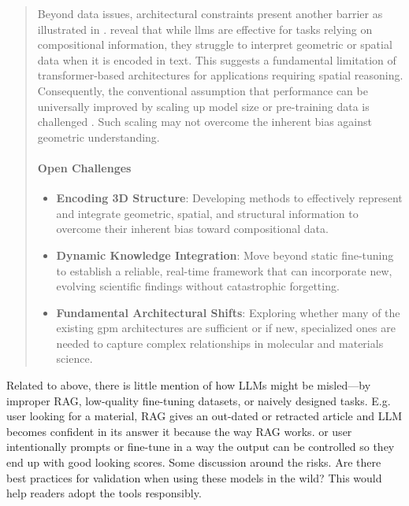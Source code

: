 \begin{reply}
\begin{quote}
Beyond data issues, architectural constraints present another barrier as illustrated in . \textcite{alampara2024mattext} reveal that while \glspl{llm} are effective for tasks relying on compositional information, they struggle to interpret geometric or spatial data when it is encoded in text. This suggests a fundamental limitation of transformer-based architectures for applications requiring spatial reasoning. Consequently, the conventional assumption that performance can be universally improved by scaling up model size or pre-training data is challenged \autocite{frey2023neural}. Such scaling may not overcome the inherent bias against geometric understanding.

\paragraph{Open Challenges}
\begin{itemize}
    \item \textbf{Encoding 3D Structure}: Developing methods to effectively represent and integrate geometric, spatial, and structural information to overcome their inherent bias toward compositional data.
    \item \textbf{Dynamic Knowledge Integration}: Move beyond static fine-tuning to establish a reliable, real-time framework that can incorporate new, evolving scientific findings without catastrophic forgetting.
    \item \textbf{Fundamental Architectural Shifts}: Exploring whether many of the existing \gls{gpm} architectures are sufficient or if new, specialized ones are needed to capture complex relationships in molecular and materials science.
\end{itemize}

\end{quote}

\end{reply}

\begin{point}
Related to above, there is little mention of how LLMs might be misled—by improper RAG, low-quality fine-tuning datasets, or naively designed tasks. E.g. user looking for a material, RAG gives an out-dated or retracted article and LLM becomes confident in its answer it because the way RAG works. or user intentionally prompts or fine-tune in a way the output can be controlled so they end up with good looking scores. Some discussion around the risks. Are there best practices for validation when using these models in the wild? This would help readers adopt the tools responsibly.
\end{point}

